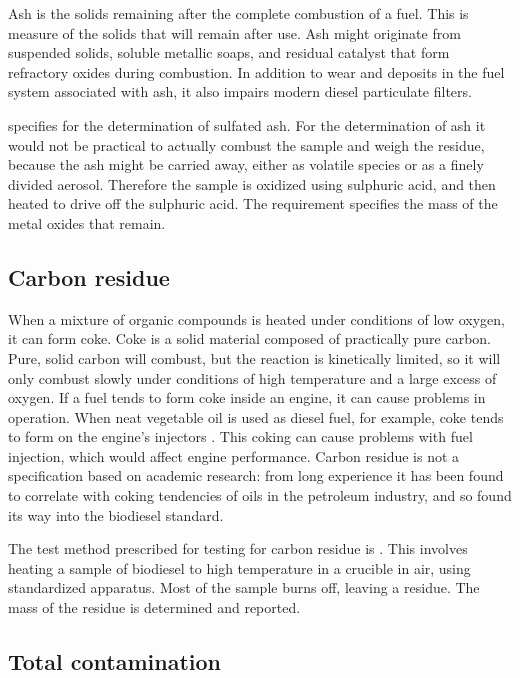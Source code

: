 Ash is the solids remaining after the complete combustion of a fuel. This is
measure of the solids that will remain after use. Ash might originate from
suspended solids, soluble metallic soaps, and residual catalyst that form
refractory oxides during combustion. In addition to wear and deposits in the
fuel system associated with ash, it also impairs modern diesel particulate
filters.

 specifies  for the determination of sulfated ash.
For the determination of ash it would not be practical to actually combust the
sample and weigh the residue, because the ash might be carried away, either as
volatile species or as a finely divided aerosol. Therefore the sample is
oxidized using sulphuric acid, and then heated to drive off the sulphuric acid.
The requirement specifies the mass of the metal oxides that remain.

\subsection{Carbon residue}
\label{sec:Coking}

When a mixture of organic compounds is heated under conditions of low oxygen, it
can form coke. Coke is a solid material composed of practically pure carbon.
Pure, solid carbon will combust, but the reaction is kinetically limited, so it
will only combust slowly under conditions of high temperature and a large excess
of oxygen. If a fuel tends to form coke inside an engine, it can cause problems
in operation. When neat vegetable oil is used as diesel fuel, for example, coke
tends to form on the engine's injectors \autocite{vanderWalt1982}. This coking
can cause problems with fuel injection, which would affect engine performance.
Carbon residue is not a specification based on academic research: from long
experience it has been found to correlate with coking tendencies of oils in the
petroleum industry, and so found its way into the biodiesel standard.

The test method prescribed for testing for carbon residue is .
This involves heating a sample of biodiesel to high temperature in a crucible in
air, using standardized apparatus. Most of the sample burns off, leaving a
residue. The mass of the residue is determined and reported.

\subsection{Total contamination}


